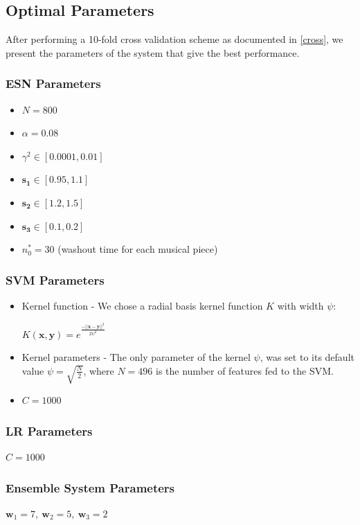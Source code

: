 \documentclass[a4paper,11pt,oneside]{article}
\begin{document}
\subsection{Optimal Parameters}
After performing a 10-fold cross validation scheme as documented in \ref{cross}, we present the parameters of the system
that give the best performance.
\subsubsection*{ESN Parameters}
\begin{itemize}
  \item $N = 800$
  \item $\alpha = 0.08$
  \item $\gamma^2 \in [0.0001,0.01]$
  \item $\mathbf{s_1}\in [0.95,1.1]$
  \item $\mathbf{s_2}\in [1.2,1.5]$
  \item $\mathbf{s_3}\in [0.1,0.2]$
  \item $n_0^* = 30$ (washout time for each musical piece)
\end{itemize}
\subsubsection*{SVM Parameters}
\begin{itemize}
  \item Kernel function - We chose a radial basis kernel function $K$ with width $\psi$:
  
  \begin{math}
    K(\mathbf{x},\mathbf{y}) = e^{\frac{-||\mathbf{x}-\mathbf{y}||^2}{2\psi^2}}
  \end{math}
    \item Kernel parameters - The only parameter of the kernel $\psi$, was set to its default value
    $\psi = \sqrt{\frac{N}{2}}$, where $N = 496$ is the number of features fed to the SVM.
    \item $C = 1000$
\end{itemize}
\subsubsection*{LR Parameters} $C = 1000$
\subsubsection*{Ensemble System Parameters}
$\mathbf{w}_1 = 7,\ \mathbf{w}_2 = 5,\ \mathbf{w}_3 = 2$
\end{document}
